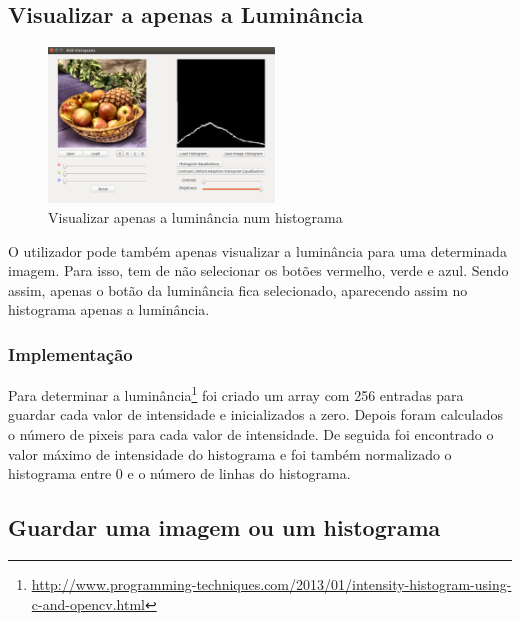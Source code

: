 \documentclass[pdftex,12pt,a4paper]{report}
\begin{document}
\subsection{Visualizar a apenas a Luminância}

\begin{figure}[!htb]
\center
 \includegraphics[width=60mm,scale=1]{imagens/only_brightness.png}
 \caption{Visualizar apenas a luminância num histograma}
 \label{fig:select_components}
\end{figure}

O utilizador pode também apenas visualizar a luminância para uma determinada imagem. Para isso, tem de não selecionar os botões vermelho, verde e azul. Sendo assim, apenas o botão da luminância fica selecionado, aparecendo assim no histograma apenas a luminância.

\subsubsection{Implementação}
Para determinar a luminância\footnote{\label{url3} \url{http://www.programming-techniques.com/2013/01/intensity-histogram-using-c-and-opencv.html}} foi criado um array com 256 entradas para guardar cada valor de intensidade e inicializados a zero. Depois foram calculados o número de pixeis para cada valor de intensidade. De seguida foi encontrado o valor máximo de intensidade do histograma e foi também normalizado o histograma entre 0 e o número de linhas do histograma.

\subsection{Guardar uma imagem ou um histograma}
\end{document}
